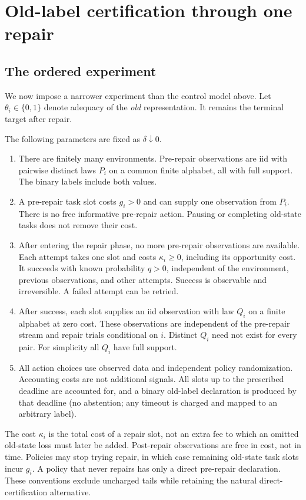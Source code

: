 \section{Old-label certification through one repair}\label{sec:certification}
\subsection{The ordered experiment}
We now impose a narrower experiment than the control model above. Let
$\theta_i\in\{0,1\}$ denote adequacy of the \emph{old} representation.
It remains the terminal target after repair.

\begin{assumption}\label{ass:repair}
The following parameters are fixed as $\delta\downarrow0$.
\begin{enumerate}
\item There are finitely many environments. Pre-repair observations are iid
with pairwise distinct laws $P_i$ on a common finite alphabet, all with full
support. The binary labels include both values.
\item A pre-repair task slot costs $g_i>0$ and can supply one observation from
$P_i$. There is no free informative pre-repair action. Pausing or completing
old-state tasks does not remove their cost.
\item After entering the repair phase, no more pre-repair observations are
available. Each attempt takes one slot and costs $\kappa_i\ge0$, including its
opportunity cost. It succeeds with known probability $q>0$, independent of
the environment, previous observations, and other attempts. Success is
observable and irreversible. A failed attempt can be retried.
\item After success, each slot supplies an iid observation with law $Q_i$
on a finite alphabet at zero cost. These observations are independent of
the pre-repair stream and repair trials conditional on $i$. Distinct $Q_i$
need not exist for every pair. For simplicity all $Q_i$ have full support.
\item All action choices use observed data and independent policy randomization.
Accounting costs are not additional signals. All slots up to the prescribed
deadline are accounted for, and a binary old-label declaration is produced by
that deadline (no abstention; any timeout is charged and mapped to an
arbitrary label).
\end{enumerate}
\end{assumption}
The cost $\kappa_i$ is the total cost of a repair slot, not an extra fee to
which an omitted old-state loss must later be added. Post-repair observations
are free in cost, not in time. Policies may stop trying repair, in which case
remaining old-state task slots incur $g_i$. A policy that never repairs has
only a direct pre-repair declaration. These conventions exclude uncharged
tails while retaining the natural direct-certification alternative.


